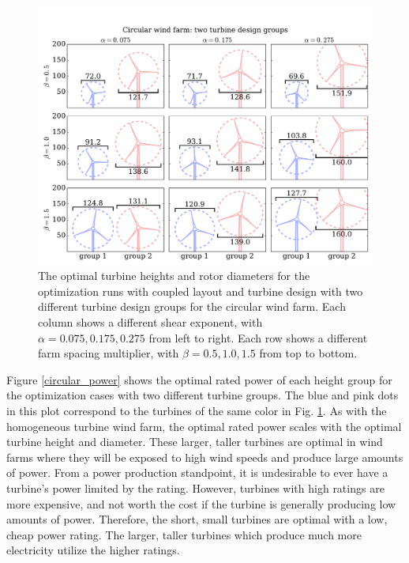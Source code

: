 \begin{figure}[htbp]
  \centering
  \includegraphics[trim={0.5cm 0.3cm 0.3cm 1.75cm},clip,width=\textwidth]{Figures/turbineSizesCircular_2.pdf}
  \caption{\label{circular_turbines} The optimal turbine heights and rotor diameters for the optimization runs with coupled layout and turbine design with two different turbine design groups for the circular wind farm. Each column shows a different shear exponent, with $\alpha=0.075,0.175,0.275$ from left to right. Each row shows a different farm spacing multiplier, with $\beta=0.5,1.0,1.5$ from top to bottom.}
\end{figure}


Figure \ref{circular_power} shows the optimal rated power of each height group for the optimization cases with two different turbine groups. The blue and pink dots in this plot correspond to the turbines of the same color in Fig. \ref{circular_turbines}. As with the homogeneous turbine wind farm, the optimal rated power scales with the optimal turbine height and diameter. These larger, taller turbines are optimal in wind farms where they will be exposed to high wind speeds and produce large amounts of power. From a power production standpoint, it is undesirable to ever have a turbine's power limited by the rating. However, turbines with high ratings are more expensive, and not worth the cost if the turbine is generally producing low amounts of power. Therefore, the short, small turbines are optimal with a low, cheap power rating. The larger, taller turbines which produce much more electricity utilize the higher ratings. 



